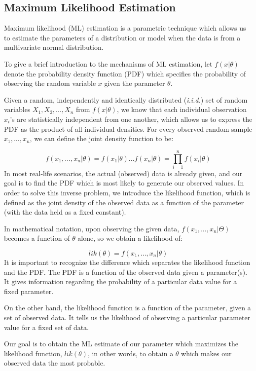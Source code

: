 \documentclass[12pt, twoside]{amherstthesis}
\begin{document}
\hypertarget{MLE}{%
\subsection{Maximum Likelihood Estimation}\label{MLE}}

Maximum likelihood (ML) estimation is a parametric technique which allows us to estimate the parameters of a distribution or model when the data is from a multivariate normal distribution.

To give a brief introduction to the mechanisms of ML estimation, let \(f(x|\theta)\) denote the probability density function (PDF) which specifies the probability of observing the random variable \(x\) given the parameter \(\theta\).

Given a random, independently and identically distributed (\emph{i.i.d.}) set of random variables \(X_1, X_2,...,X_n\) from \(f(x|\theta)\), we know that each individual observation \(x_i\)'s are statistically independent from one another, which allows us to express the PDF as the product of all individual densities. For every observed random sample \(x_1,...,x_n\), we can define the joint density function to be:

\[f(x_1,...,x_n|\theta) = f(x_1|\theta)...f(x_n|\theta) = \prod_{i=1}^{n}f(x_i|\theta)\]
In most real-life scenarios, the actual (observed) data is already given, and our goal is to find the PDF which is most likely to generate our observed values. In order to solve this inverse problem, we introduce the likelihood function, which is defined as the joint density of the observed data as a function of the parameter (with the data held as a fixed constant).

In mathematical notation, upon observing the given data, \(f(x_1,...,x_n|\Theta)\) becomes a function of \(\theta\) alone, so we obtain a likelihood of:

\[lik(\theta) = f(x_1,...,x_n|\theta)\]
It is important to recognize the difference which separates the likelihood function and the PDF. The PDF is a function of the observed data given a parameter(s). It gives information regarding the probability of a particular data value for a fixed parameter.

On the other hand, the likelihood function is a function of the parameter, given a set of observed data. It tells us the likelihood of observing a particular parameter value for a fixed set of data.

Our goal is to obtain the ML estimate of our parameter which maximizes the likelihood function, \(lik(\theta)\), in other words, to obtain a \(\theta\) which makes our observed data the most probable.
\end{document}
